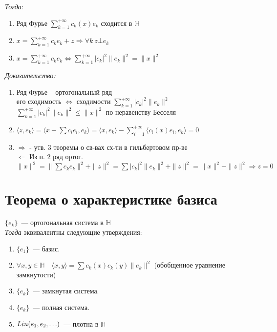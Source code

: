 \documentclass[paper=a4, fontsize=17pt]{article}
\begin{document}
\emph{Тогда}:
\begin{enumerate}
	\item Ряд Фурье $\sum\limits_{k=1}^{+\infty} c_k(x) e_k$ сходится в $\mathds{H}$
	\item $x =\sum\limits_{k=1}^{+\infty} c_k e_k + z \Rightarrow \forall k \ z \bot e_k$
	\item $x =\sum\limits_{k=1}^{+\infty} c_k e_k \Leftrightarrow \sum\limits_{k=1}^{+\infty} \vert c_k \vert^2 \|e_k\|^2=\|x\|^2$
\end{enumerate}

\emph{Доказательство:}
\begin{enumerate}
	\item
	Ряд Фурье -- ортогональный ряд\\
	его сходимость $\Leftrightarrow$ сходимости $\sum\limits_{k=1}^{+\infty} \vert c_k \vert^2 \|e_k\|^2$\\
	$\sum\limits_{k=1}^{+\infty} \vert c_k \vert^2 \|e_k\|^2 \le \|x\|^2$ по неравенству Бесселя
	\item
	$\langle z, e_k \rangle = \langle x - \sum c_i e_i, e_k \rangle = \langle x, e_k \rangle - \sum\limits_{i = 1}^{+\infty}  \langle c_i(x) e_i ,e_k \rangle = 0$
	\item
	$\Rightarrow$ - утв. 3 теоремы о св-вах сх-ти в гильбертовом пр-ве\\
	$\Leftarrow$
		Из п. 2 ряд ортог.\\
		$\|x\|^2=\|\sum c_k e_k\|^2 + \|z\|^2 = \sum \vert c_k \vert^2 \|e_k\|^2 + \|z\|^2 = \|x\|^2 + \|z\|^2 \Rightarrow z = 0$
\end{enumerate}

\iffalse
$\mathbf{TODO}$ Замечания. Не уверен, нужны ли они
\fi

\section{Теорема о характеристике базиса}

$\{e_k\}$~--- ортогональная система в $\mathds{H}$\\

\emph{Тогда} эквивалентны следующие утверждения:
\begin{enumerate}
	\item $\{e_1\}$~--- базис.
	\item $\forall x, y \in \mathds{H} \quad \langle x, y \rangle = \sum c_k(x)\overline{c_k(y)}\|e_k\|^2$ (обобщенное уравнение замкнутости)
	\item $\{e_k\}$~--- замкнутая система.
	\item $\{e_k\}$~--- полная система.
	\item $Lin(e_1, e_2, \mathellipsis)$~--- плотна в $\mathds{H}$
\end{enumerate}
\end{document}
